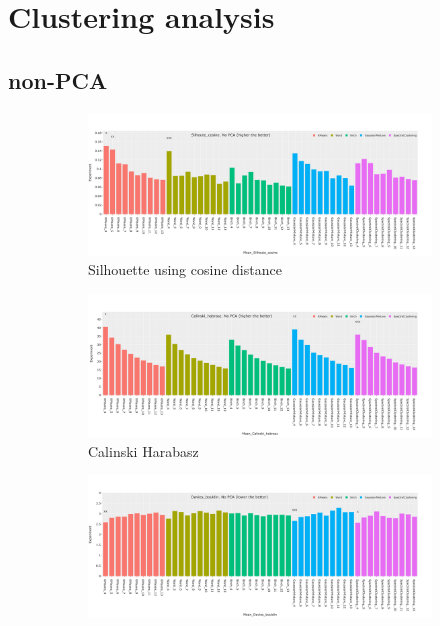\section{Clustering analysis} \label{s:ap:cs}


\subsection{non-PCA} \label{s:ap:non-pca}


\begin{figure}[!h]
    \captionsetup[subfigure]{justification=Centering}
    \centering
    \begin{subfigure}[!t]{0.6\textwidth}
        \includegraphics[width=\textwidth]{Sections/ClusteringAnalysis/Resources/cs_top3/nonPCA/non_PCA_top3_Silhoute_cosine.png}
        \caption{Silhouette using cosine distance}
        \label{fig:ap:cosine}
    \end{subfigure}
    \centering
    \begin{subfigure}[!t]{0.6\textwidth}
        \includegraphics[width=\textwidth]{Sections/ClusteringAnalysis/Resources/cs_top3/nonPCA/non_PCA_top3_Calinski_habrasz.png}
        \caption{Calinski Harabasz}
        \label{fig:ap:cal_hab}
    \end{subfigure}
    \centering
    \begin{subfigure}[!t]{0.6\textwidth}
        \includegraphics[width=\textwidth]{Sections/ClusteringAnalysis/Resources/cs_top3/nonPCA/non_PCA_top3_Davies_bouldin.png}

\end{subfigure}
\end{figure}
